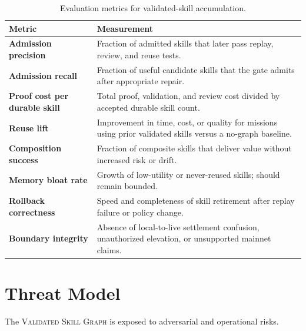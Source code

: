 \documentclass[10.5pt]{article}
\theoremstyle{goThm}
\newcommand{\vsg}{\textsc{Validated Skill Graph}}
\begin{document}
\begin{table}[H]
\centering
\caption{Evaluation metrics for validated-skill accumulation.}
\label{tab:metrics}
\begin{tabularx}{\textwidth}{>{\bfseries\color{goNavy}}p{}X}
\toprule
Metric & Measurement \\
\midrule
Admission precision & Fraction of admitted skills that later pass replay, review, and reuse tests. \\
Admission recall & Fraction of useful candidate skills that the gate admits after appropriate repair. \\
Proof cost per durable skill & Total proof, validation, and review cost divided by accepted durable skill count. \\
Reuse lift & Improvement in time, cost, or quality for missions using prior validated skills versus a no-graph baseline. \\
Composition success & Fraction of composite skills that deliver value without increased risk or drift. \\
Memory bloat rate & Growth of low-utility or never-reused skills; should remain bounded. \\
Rollback correctness & Speed and completeness of skill retirement after replay failure or policy change. \\
Boundary integrity & Absence of local-to-live settlement confusion, unauthorized elevation, or unsupported mainnet claims. \\
\bottomrule
\end{tabularx}
\end{table}

\section{Threat Model}
The \vsg{} is exposed to adversarial and operational risks.
\end{document}
